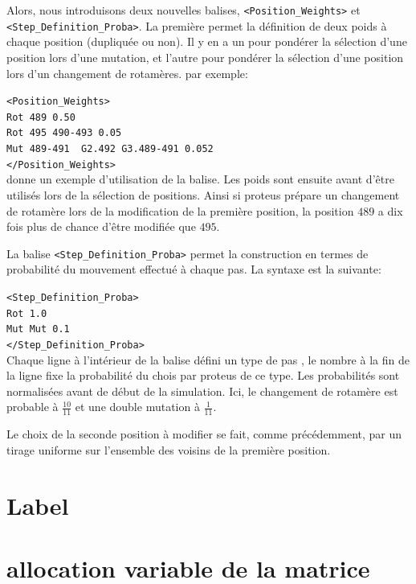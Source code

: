 Alors, nous introduisons deux nouvelles balises, \verb!<Position_Weights>!  et \verb!<Step_Definition_Proba>!. La première permet la définition de deux poids à chaque position (dupliquée ou non). Il y en a un pour pondérer la sélection d'une position lors d'une mutation, et l'autre pour pondérer la sélection d'une position lors d'un changement de rotamères.
par exemple:

\verb!<Position_Weights>! \\
\verb!Rot 489 0.50 ! \\
\verb!Rot 495 490-493 0.05 ! \\
\verb!Mut 489-491  G2.492 G3.489-491 0.052 ! \\
\verb!</Position_Weights>! \\

donne un exemple d'utilisation de la balise. Les poids sont ensuite avant d'être utilisés lors de la sélection de positions. Ainsi si proteus prépare un changement de rotamère lors de la modification de la première position, la position $489$ a dix fois plus de chance d'être modifiée que $495$.



La balise \verb!<Step_Definition_Proba>! permet la construction en termes de probabilité du mouvement effectué à chaque pas. La syntaxe est la suivante:

\verb!<Step_Definition_Proba>! \\
\verb!Rot 1.0! \\
\verb!Mut Mut 0.1! \\
\verb!</Step_Definition_Proba>! \\

Chaque ligne à l'intérieur de la balise défini un type de pas , le nombre à la fin de la ligne fixe la probabilité du chois par proteus de ce type. Les probabilités sont normalisées avant de début de la simulation. Ici, le changement de rotamère est probable à $\frac{10}{11}$ et une double mutation à $\frac{1}{11}$.

Le choix de la seconde position à modifier se fait, comme précédemment, par un tirage uniforme sur l'ensemble des voisins de la première position.




\section{Label}
\section{allocation variable de la matrice}

\clearpage


